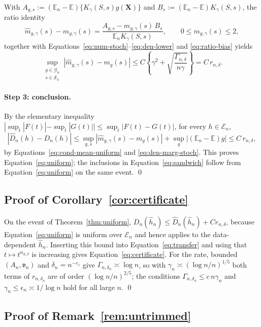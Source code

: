With $A_{g,s}:=(\mathbb{E}_n-\mathbb{E})\{K_{\gamma}(S,s)g(\mathbf{X})\}$ and $B_s:=(\mathbb{E}_n-\mathbb{E})K_{\gamma}(S,s)$, the ratio identity
\[
  \widehat{m}_{g,\gamma}(s)-m_{g,\gamma}(s)
  =\frac{A_{g,s}-m_{g,\gamma}(s)\,B_s}{\mathbb{E}_nK_{\gamma}(S,s)},
  \qquad 0\le m_{g,\gamma}(s)\le2,
\]
together with Equations~\ref{eq:num-stoch}--\ref{eq:den-lower} and \ref{eq:ratio-bias} yields
\begin{equation}
  \sup_{\substack{g\in\mathcal{G}_n\\ s\in\mathcal{S}_n}}
  |\widehat{m}_{g,\gamma}(s)-m_g(s)|
  \le C\left\{\gamma^2+\sqrt{\frac{\Gamma_{n,\delta}}{n\gamma}}\right\}
  =C\,r_{n,\delta} .
  \label{eq:cond-mean-uniform}
\end{equation}

\paragraph{Step 3: conclusion.}
By the elementary inequality $|\sup_t|F(t)|-\sup_t|G(t)||\le\sup_t|F(t)-G(t)|$, for every $h\in\mathcal{E}_n$,
\[
  |\widehat{D}_n(h)-D_n(h)|
  \le\sup_{g,s}|\widehat{m}_{g,\gamma}(s)-m_g(s)|
     +\sup_{g}|(\mathbb{E}_n-\mathbb{E})g|
  \le C\,r_{n,\delta},
\]
by Equations~\ref{eq:cond-mean-uniform} and \ref{eq:den-marg-stoch}.  This proves Equation~\ref{eq:uniform}; the inclusions in Equation~\ref{eq:sandwich} follow from Equation~\ref{eq:uniform} on the same event.
\qed

\subsection{Proof of Corollary~\ref{cor:certificate}}

On the event of Theorem~\ref{thm:uniform}, $D_n(\widehat{h}_n)\le\widehat{D}_n(\widehat{h}_n)+Cr_{n,\delta}$, because Equation~\ref{eq:uniform} is uniform over $\mathcal{E}_n$ and hence applies to the data-dependent $\widehat{h}_n$.  Inserting this bound into Equation~\ref{eq:transfer} and using that $t\mapsto t^{\alpha_{d,\beta}}$ is increasing gives Equation~\ref{eq:certificate}.  For the rate, bounded $(A_n,\mathfrak{v}_n)$ and $\delta_n=n^{-c_1}$ give $\Gamma_{n,\delta_n}\asymp\log n$, so with $\gamma_n\asymp(\log n/n)^{1/5}$ both terms of $r_{n,\delta_n}$ are of order $(\log n/n)^{2/5}$; the conditions $\Gamma_{n,\delta_n}\le c\,n\gamma_n$ and $\gamma_n\le\epsilon_n\asymp1/\log n$ hold for all large $n$.
\qed

\subsection{Proof of Remark~\ref{rem:untrimmed}}
\label{app:untrimmed}

